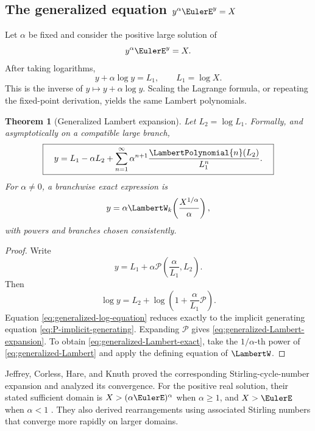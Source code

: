\documentclass[11pt]{article}
\theoremstyle{pltheorem}
\newtheorem{theorem}{Theorem}[section]
\begin{document}
\subsection{\texorpdfstring{The generalized equation \(y^\alpha\EulerE^y=X\)}{The generalized equation y to the alpha times exp(y) = X}}

Let \(\alpha\) be fixed and consider the positive large solution of
\begin{equation}\label{eq:generalized-Lambert}
 y^\alpha\EulerE^y=X.
\end{equation}
After taking logarithms,
\begin{equation}\label{eq:generalized-log-equation}
 y+\alpha\log y=L_1,
 \qquad
 L_1=\log X.
\end{equation}
This is the inverse of \(y\mapsto y+\alpha\log y\).  Scaling the Lagrange formula, or repeating the fixed-point derivation, yields the same Lambert polynomials.

\begin{theorem}[Generalized Lambert expansion]\label{thm:generalized-Lambert}
Let \(L_2=\log L_1\).  Formally, and asymptotically on a compatible large branch,
\begin{equation}\label{eq:generalized-Lambert-expansion}
 \boxed{\quad
 y=L_1-\alpha L_2
 +\sum_{n=1}^{\infty}
 \alpha^{n+1}\frac{\LambertPolynomial{n}(L_2)}{L_1^n}.
 \quad}
\end{equation}
For \(\alpha\ne0\), a branchwise exact expression is
\begin{equation}\label{eq:generalized-Lambert-exact}
 y=\alpha \LambertW_k\!\left(\frac{X^{1/\alpha}}{\alpha}\right),
\end{equation}
with powers and branches chosen consistently.
\end{theorem}

\begin{proof}
Write
\[
 y=L_1+\alpha\mathcal P\!\left(\frac{\alpha}{L_1},L_2\right).
\]
Then
\[
 \log y=L_2+\log\left(1+\frac{\alpha}{L_1}\mathcal P\right).
\]
Equation \cref{eq:generalized-log-equation} reduces exactly to the implicit generating equation
\cref{eq:P-implicit-generating}.  Expanding \(\mathcal P\) gives
\cref{eq:generalized-Lambert-expansion}.  To obtain
\cref{eq:generalized-Lambert-exact}, take the \(1/\alpha\)-th power of \cref{eq:generalized-Lambert} and apply the defining equation of \(\LambertW\).
\end{proof}

Jeffrey, Corless, Hare, and Knuth proved the corresponding Stirling-cycle-number expansion and analyzed its convergence.  For the positive real solution, their stated sufficient domain is
\(X>(\alpha\EulerE)^\alpha\) when \(\alpha\ge1\), and \(X>\EulerE\) when \(\alpha<1\) \cite{jeffrey-et-al-1995}.  They also derived rearrangements using associated Stirling numbers that converge more rapidly on larger domains.
\end{document}
